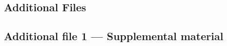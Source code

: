 \documentclass{bmcart}
\begin{document}
\begin{backmatter}

\section*{Additional Files}
  \subsection*{Additional file 1 --- Supplemental material}

\end{backmatter}
\end{document}
